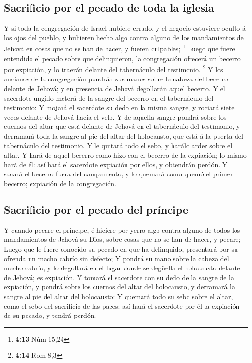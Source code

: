 \hypertarget{sacrificio-por-el-pecado-de-toda-la-iglesia}{%
\subsection{Sacrificio por el pecado de toda la
iglesia}\label{sacrificio-por-el-pecado-de-toda-la-iglesia}}

 Y si toda la congregación de Israel hubiere errado, y el
negocio estuviere oculto á los ojos del pueblo, y hubieren hecho algo
contra alguno de los mandamientos de Jehová en cosas que no se han de
hacer, y fueren culpables; \footnote{\textbf{4:13} Núm 15,24}
 Luego que fuere entendido el pecado sobre que
delinquieron, la congregación ofrecerá un becerro por expiación, y lo
traerán delante del tabernáculo del testimonio. \footnote{\textbf{4:14}
  Rom 8,3}  Y los ancianos de la congregación pondrán sus
manos sobre la cabeza del becerro delante de Jehová; y en presencia de
Jehová degollarán aquel becerro.  Y el sacerdote ungido
meterá de la sangre del becerro en el tabernáculo del testimonio:
 Y mojará el sacerdote su dedo en la misma sangre, y
rociará siete veces delante de Jehová hacia el velo.  Y de
aquella sangre pondrá sobre los cuernos del altar que está delante de
Jehová en el tabernáculo del testimonio, y derramará toda la sangre al
pie del altar del holocausto, que está á la puerta del tabernáculo del
testimonio.  Y le quitará todo el sebo, y harálo arder
sobre el altar.  Y hará de aquel becerro como hizo con el
becerro de la expiación; lo mismo hará de él: así hará el sacerdote
expiación por ellos, y obtendrán perdón.  Y sacará el
becerro fuera del campamento, y lo quemará como quemó el primer becerro;
expiación de la congregación.

\hypertarget{sacrificio-por-el-pecado-del-pruxedncipe}{%
\subsection{Sacrificio por el pecado del
príncipe}\label{sacrificio-por-el-pecado-del-pruxedncipe}}

 Y cuando pecare el príncipe, é hiciere por yerro algo
contra alguno de todos los mandamientos de Jehová su Dios, sobre cosas
que no se han de hacer, y pecare;  Luego que le fuere
conocido su pecado en que ha delinquido, presentará por su ofrenda un
macho cabrío sin defecto;  Y pondrá su mano sobre la cabeza
del macho cabrío, y lo degollará en el lugar donde se degüella el
holocausto delante de Jehová; es expiación.  Y tomará el
sacerdote con su dedo de la sangre de la expiación, y pondrá sobre los
cuernos del altar del holocausto, y derramará la sangre al pie del altar
del holocausto:  Y quemará todo su sebo sobre el altar,
como el sebo del sacrificio de las paces: así hará el sacerdote por él
la expiación de su pecado, y tendrá perdón.

